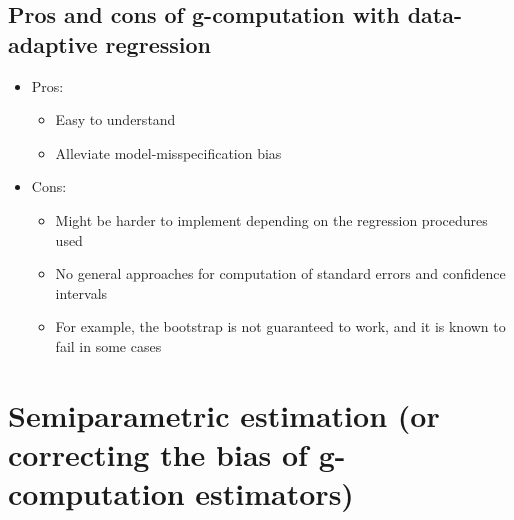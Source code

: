 \documentclass[
  12pt,
]{book}
\providecommand{\tightlist}{%
  \setlength{\itemsep}{0pt}\setlength{\parskip}{0pt}}
\theoremstyle{definition}
\theoremstyle{definition}
\theoremstyle{definition}
\newcommand{\1}{\mathbbm{1}}
\begin{document}
\hypertarget{pros-and-cons-of-g-computation-with-data-adaptive-regression}{%
\subsection{Pros and cons of g-computation with data-adaptive regression}\label{pros-and-cons-of-g-computation-with-data-adaptive-regression}}

\begin{itemize}
\tightlist
\item
  Pros:

  \begin{itemize}
  \tightlist
  \item
    Easy to understand
  \item
    Alleviate model-misspecification bias
  \end{itemize}
\item
  Cons:

  \begin{itemize}
  \tightlist
  \item
    Might be harder to implement depending on the regression procedures used
  \item
    No general approaches for computation of standard errors and confidence
    intervals
  \item
    For example, the bootstrap is not guaranteed to work, and it is known to
    fail in some cases
  \end{itemize}
\end{itemize}

\hypertarget{semiparametric-estimation-or-correcting-the-bias-of-g-computation-estimators}{%
\section{Semiparametric estimation (or correcting the bias of g-computation estimators)}\label{semiparametric-estimation-or-correcting-the-bias-of-g-computation-estimators}}
\end{document}
